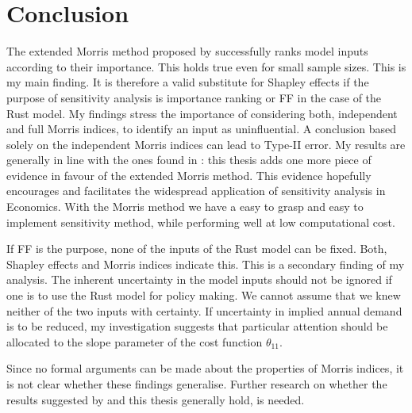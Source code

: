 \section{Conclusion} \label{conclusion}



The extended Morris method proposed by \citet{GM17} successfully ranks model inputs according to their importance. This holds true even for small sample sizes. This is my main finding. It is therefore a valid substitute for Shapley effects if the purpose of sensitivity analysis is importance ranking or FF in the case of the Rust model. My findings stress the importance of considering both, independent and full Morris indices, to identify an input as uninfluential. A conclusion based solely on the independent Morris indices can lead to Type-II error. My results are generally in line with the ones found in \citet{GM17}: this thesis adds one more piece of evidence in favour of the extended Morris method. This evidence hopefully encourages and facilitates the widespread application of sensitivity analysis in Economics. With the Morris method we have a easy to grasp and easy to implement sensitivity method, while performing well at low computational cost.

If FF is the purpose, none of the inputs of the Rust model can be fixed. Both, Shapley effects and Morris indices indicate this. This is a secondary finding of my analysis. The inherent uncertainty in the model inputs should not be ignored if one is to use the Rust model for policy making. We cannot assume that we knew neither of the two inputs with certainty. If uncertainty in implied annual demand is to be reduced, my investigation suggests that particular attention should be allocated to the slope parameter of the cost function $\theta_{11}$.


Since no formal arguments can be made about the properties of Morris indices, it is not clear whether these findings generalise. Further research on whether the results suggested by \citet{GM17} and this thesis generally hold, is needed.

